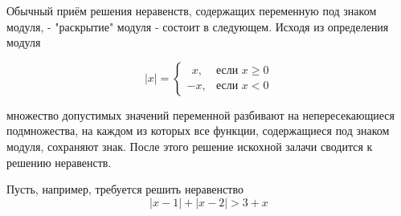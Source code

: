 Обычный приём решения неравенств, содержащих переменную под знаком модуля, - "раскрытие" модуля - состоит в следующем. Исходя из определения модуля

\[ |x| =
  \begin{cases}
    \ \ x,  &  \text{если } x \geq 0\\
    -x,     &  \text{если } x < 0
  \end{cases}
\]

\noindent множество допустимых значений переменной разбивают на непересекающиеся подмножества, на каждом из которых все функции, содержащиеся под знаком модуля, сохраняют знак.
После этого решение искохной залачи сводится к решению  неравенств.

Пусть, например, требуется решить неравенство 
\[|x-1| + |x-2| > 3+x\]



